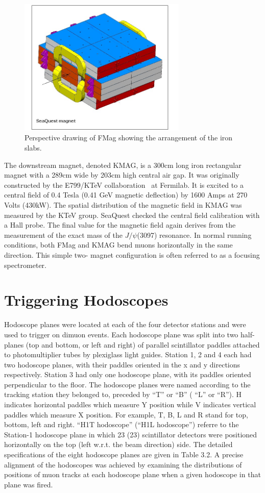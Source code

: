 \begin{figure}
	\centering
	\includegraphics[width=8cm]{figures/FMAG}
	\caption{Perspective drawing of FMag showing the arrangement of the iron slabs. \label{fig:FMag}}
\end{figure}

The downstream magnet, denoted KMAG, is a 300cm long iron rectangular magnet with a 289cm wide by 203cm high central air gap.  It was originally constructed by the E799/KTeV collaboration~\cite{PhysRevD.67.012005} at Fermilab.  It is excited to a central field of 0.4 Tesla (0.41 GeV magnetic deflection) by 1600 Amps at 270 Volts (430kW).  The spatial distribution of the magnetic field in KMAG was measured by the KTeV group. SeaQuest checked the central field calibration with a Hall probe.  The final value for the magnetic field again derives from the measurement of the exact mass of the $J/\psi$(3097) resonance.   In normal running conditions, both FMag and KMAG bend muons horizontally in the same direction. This simple two- magnet configuration is often referred to as a focusing spectrometer.


\section{Triggering Hodoscopes}

Hodoscope planes were located at each of the four detector stations and were used
to trigger on dimuon events. Each hodoscope plane was split into two half-planes
(top and bottom, or left and right) of parallel scintillator paddles attached to photomultiplier tubes by plexiglass light guides. Station 1, 2 and 4 each had two hodoscope planes, with their paddles oriented in the x and y directions respectively.
Station 3 had only one hodoscope plane, with its paddles oriented perpendicular to
the floor. The hodoscope planes were named according to the tracking station they
belonged to, preceded by “T” or “B” ( “L” or “R”). H indicates horizontal paddles which measure Y position while V indicates vertical paddles which measure X
position. For example, T, B, L and R stand for top, bottom, left and right. “H1T
hodoscope” (“H1L hodoscope”) referre to the Station-1 hodoscope plane in which
23 (23) scintillator detectors were positioned horizontally on the top (left w.r.t. the
beam direction) side. The detailed specifications of the eight hodoscope planes are
given in Table 3.2. A precise alignment of the hodoscopes was achieved by examining the distributions of positions of muon tracks at each hodoscope plane when a
given hodoscope in that plane was fired.

